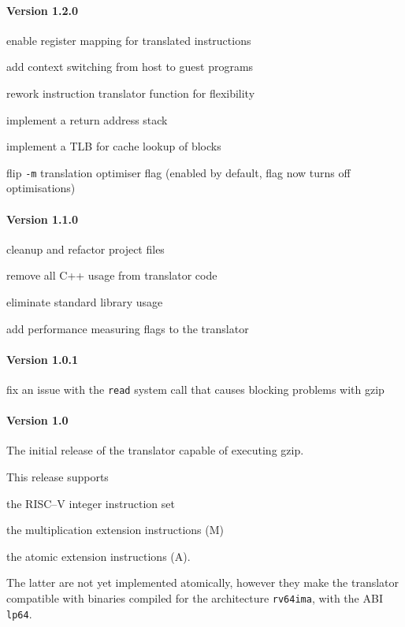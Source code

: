 \paragraph{Version 1.2.0}
\begin{itemize*}
 	\item enable register mapping for translated instructions
 	\item add context switching from host to guest programs
 	\item rework instruction translator function for flexibility
 	\item implement a return address stack
 	\item implement a TLB for cache lookup of blocks
 	\item flip \texttt{-m} translation optimiser flag (enabled by default, flag now turns off optimisations)
\end{itemize*}


\paragraph{Version 1.1.0}
\begin{itemize*}
 	\item cleanup and refactor project files
 	\item remove all C++ usage from translator code
 	\item eliminate standard library usage
 	\item add performance measuring flags to the translator
\end{itemize*}


\paragraph{Version 1.0.1}
\begin{itemize*}
 	\item fix an issue with the \texttt{read} system call that causes blocking problems with gzip
\end{itemize*}


\paragraph{Version 1.0}
The initial release of the translator capable of executing gzip.

This release supports
\begin{itemize*}
 	\item the RISC--V integer instruction set
 	\item the multiplication extension instructions (M)
 	\item the atomic extension instructions (A).
\end{itemize*}

The latter are not yet implemented atomically, however they make the translator compatible with binaries compiled for the architecture \texttt{rv64ima}, with the ABI \texttt{lp64}.



